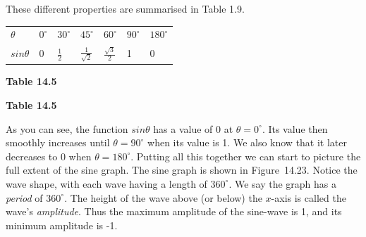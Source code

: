         \label{m39345*id241837}These different properties are summarised in Table 1.9.\par 
          \begin{table}[H]
        \begin{center}
      \label{m39414*id84073}
    \noindent
      \tablelasttail{}
      \begin{xtabular}[t]{|l|l|l|l|l|l|l|}\hline
                  $\theta $
                 &
                  ${0}^{\circ }$
                 &
                  ${30}^{\circ }$
                 &
                  ${45}^{\circ }$
                 &
                  ${60}^{\circ }$
                 &
                  ${90}^{\circ }$
                 &
                  ${180}^{\circ }$
     \tabularnewline{}
                  $sin\theta $
                 &
        0 &
                  $\frac{1}{2}$
                 &
                  $\frac{1}{\sqrt{2}}$
                 &
                  $\frac{\sqrt{3}}{2}$
                 &
        1 &
        0%
     \tabularnewline{}
    \end{xtabular}
      \end{center}
    \begin{center}{\small\bfseries Table 14.5}\end{center}
    \begin{caption}{\small\bfseries Table 14.5}\end{caption}
\end{table}
    \par
        \label{m39414*id84327}As you can see, the function $sin\theta $ has a value of 0 at $\theta ={0}^{\circ }$. Its value then smoothly increases until $\theta ={90}^{\circ }$ when its value is 1. We also know that it later decreases to 0 when $\theta ={180}^{\circ }$. Putting all this together we can start to picture the full extent of the sine graph. The sine graph is shown in Figure~14.23. Notice the wave shape, with each wave having a length of ${360}^{\circ }$. We say the graph has a \textsl{period} of ${360}^{\circ }$. The height of the wave above (or below) the $x$-axis is called the wave's \textsl{amplitude}. Thus the maximum amplitude of the sine-wave is 1, and its minimum amplitude is -1.\par 
